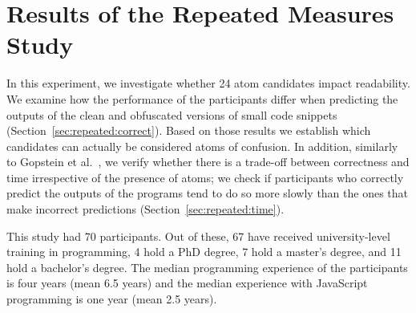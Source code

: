 


\section{Results of the Repeated Measures Study}\label{sec:repeated}

In this experiment, we investigate whether 24 atom candidates impact readability. We examine how the performance of the participants differ when predicting the outputs of the clean and obfuscated versions of small code snippets (Section~\ref{sec:repeated:correct}). Based on those results we establish which candidates can actually be considered atoms of confusion. In addition, similarly to Gopstein et al.~\cite{DBLP:conf/sigsoft/GopsteinIYDZYC17}, we verify whether there is a trade-off between correctness and time irrespective of the presence of atoms; we check if participants who correctly predict the outputs of the programs tend to do so more slowly than the ones that make incorrect predictions (Section~\ref{sec:repeated:time}). 

This study had 70 participants. Out of these, 67 have received university-level training in programming, 4 hold a PhD degree, 7 hold a master's degree, and 11 hold a bachelor's degree. 
The median programming experience of the participants is four years (mean 6.5 years) and the median experience with JavaScript programming is one year (mean 2.5 years). 

